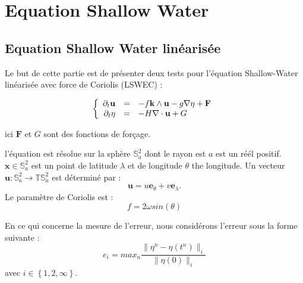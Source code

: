 \chapter{Equation Shallow Water}

\section{Equation Shallow Water linéarisée}

Le but de cette partie est de présenter deux tests pour l'équation Shallow-Water linéarisée avec force de Coriolis (LSWEC) :

\begin{equation}
\label{LSWEC}
\left\lbrace
\begin{array}{r c l}
\partial_t \mathbf{u} & = & -f \mathbf{k} \wedge \mathbf{u} - g \nabla \eta + \mathbf{F} \\
\partial_t \eta & = & -H \nabla \cdot \mathbf{u} + G
\end{array}
\right.
\end{equation}

ici $\mathbf{F}$ et $G$ sont des fonctions de forçage.

l'équation est résolue sur la sphère $\mathbb{S}_a^2$ dont le rayon est $a$ est un réél positif. $\mathbf{x} \in \mathbb{S}_a^2$ est un point de latitude $\lambda$ et de longitude $\theta$ the longitude. Un vecteur $\mathbf{u} : \mathbb{S}_a^2 \rightarrow \mathbb{T}\mathbb{S}_a^2$ est déterminé par :
\begin{equation}
\mathbf{u} = u \mathbf{e}_{\theta} + v \mathbf{e}_{\lambda}.
\end{equation}
Le paramètre de Coriolis est :
\begin{equation}
f=2 \omega sin ( \theta )
\label{coriolis_parameter}
\end{equation}

En ce qui concerne la mesure de l'erreur, nous considérons l'erreur sous la forme suivante :
\begin{equation}
e_{i} = max_n \dfrac{\| \eta^n - \eta(t^n) \|_{i}}{\| \eta(0) \|_{i}}
\end{equation}
avec $i \in \left\lbrace 1, 2, \infty \right\rbrace$.






























